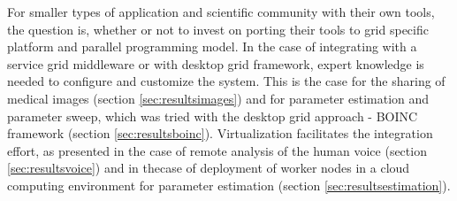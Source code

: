 

For smaller types of application and scientific community with their own tools, the question is, whether or not to invest on porting their tools to grid specific platform and parallel programming model. 
In the case of integrating with a service grid middleware or with desktop grid framework, expert knowledge is needed to configure and customize the system. This is the case for the sharing of medical images (section \ref{sec:resultsimages}) and for parameter estimation and parameter sweep, which was tried with the desktop grid approach - BOINC framework (section \ref{sec:resultsboinc}). %
Virtualization facilitates the integration effort, as presented in the case of remote analysis of the human voice (section \ref{sec:resultsvoice}) and in thecase of deployment of worker nodes in a cloud computing environment for parameter estimation (section \ref{sec:resultsestimation}). %

